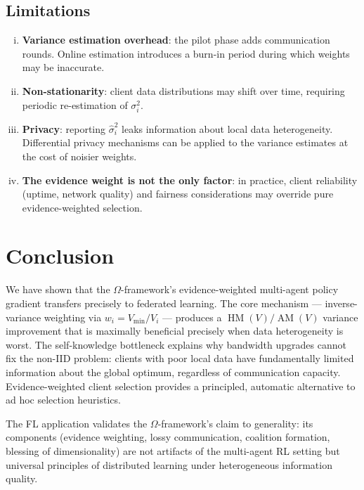 \documentclass[11pt,a4paper]{article}
\DeclareMathOperator{\AM}{AM}
\DeclareMathOperator{\HM}{HM}
\begin{document}
\subsection{Limitations}

\begin{enumerate}[(i)]
  \item \textbf{Variance estimation overhead}: the pilot phase adds
    communication rounds. Online estimation introduces a burn-in period
    during which weights may be inaccurate.
  \item \textbf{Non-stationarity}: client data distributions may shift over
    time, requiring periodic re-estimation of $\sigma_i^2$.
  \item \textbf{Privacy}: reporting $\hat{\sigma}_i^2$ leaks information
    about local data heterogeneity. Differential privacy mechanisms can
    be applied to the variance estimates at the cost of noisier weights.
  \item \textbf{The evidence weight is not the only factor}: in practice,
    client reliability (uptime, network quality) and fairness considerations
    may override pure evidence-weighted selection.
\end{enumerate}


\section{Conclusion}
\label{sec:conclusion}

We have shown that the $\Omega$-framework's evidence-weighted multi-agent
policy gradient transfers precisely to federated learning. The core
mechanism --- inverse-variance weighting via $w_i = V_{\min}/V_i$ ---
produces a $\HM(V)/\AM(V)$ variance improvement that is maximally
beneficial precisely when data heterogeneity is worst. The self-knowledge
bottleneck explains why bandwidth upgrades cannot fix the non-IID problem:
clients with poor local data have fundamentally limited information about
the global optimum, regardless of communication capacity. Evidence-weighted
client selection provides a principled, automatic alternative to ad hoc
selection heuristics.

The FL application validates the $\Omega$-framework's claim to generality:
its components (evidence weighting, lossy communication, coalition
formation, blessing of dimensionality) are not artifacts of the multi-agent
RL setting but universal principles of distributed learning under
heterogeneous information quality.
\end{document}
